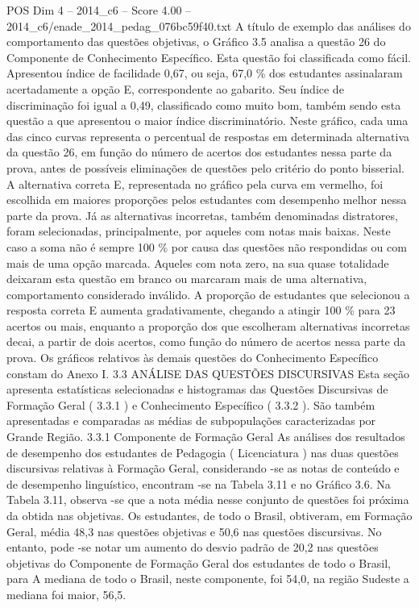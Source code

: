 \begin{textsample}{POS Dim 4 – 2014\_c6 – Score 4.00 – 2014\_c6/enade\_2014\_pedag\_076bc59f40.txt}
A título de exemplo das análises do comportamento das questões objetivas, o Gráfico 3.5 analisa a questão 26 do Componente de Conhecimento Específico.
Esta questão foi classificada como fácil.
Apresentou índice de facilidade 0,67, ou seja, 67,0 \% dos estudantes assinalaram acertadamente a opção E, correspondente ao gabarito.
Seu índice de discriminação foi igual a 0,49, classificado como muito bom, também sendo esta questão a que apresentou o maior índice discriminatório.
Neste gráfico, cada uma das cinco curvas representa o percentual de respostas em determinada alternativa da questão 26, em função do número de acertos dos estudantes nessa parte da prova, antes de possíveis eliminações de questões pelo critério do ponto bisserial.
A alternativa correta E, representada no gráfico pela curva em vermelho, foi escolhida em maiores proporções pelos estudantes com desempenho melhor nessa parte da prova.
Já as alternativas incorretas, também denominadas distratores, foram selecionadas, principalmente, por aqueles com notas mais baixas.
Neste caso a soma não é sempre 100 \% por causa das questões não respondidas ou com mais de uma opção marcada.
Aqueles com nota zero, na sua quase totalidade deixaram esta questão em branco ou marcaram mais de uma alternativa, comportamento considerado inválido.
A proporção de estudantes que selecionou a resposta correta E aumenta gradativamente, chegando a atingir 100 \% para 23 acertos ou mais, enquanto a proporção dos que escolheram alternativas incorretas decai, a partir de dois acertos, como função do número de acertos nessa parte da prova.
Os gráficos relativos às demais questões do Conhecimento Específico constam do Anexo I. 3.3 ANÁLISE DAS QUESTÕES DISCURSIVAS Esta seção apresenta estatísticas selecionadas e histogramas das Questões Discursivas de Formação Geral ( 3.3.1 ) e Conhecimento Específico ( 3.3.2 ).
São também apresentadas e comparadas as médias de subpopulações caracterizadas por Grande Região. 3.3.1 Componente de Formação Geral As análises dos resultados de desempenho dos estudantes de Pedagogia ( Licenciatura ) nas duas questões discursivas relativas à Formação Geral, considerando -se as notas de conteúdo e de desempenho linguístico, encontram -se na Tabela 3.11 e no Gráfico 3.6.
Na Tabela 3.11, observa -se que a nota média nesse conjunto de questões foi próxima da obtida nas objetivas.
Os estudantes, de todo o Brasil, obtiveram, em Formação Geral, média 48,3 nas questões objetivas e 50,6 nas questões discursivas.
No entanto, pode -se notar um aumento do desvio padrão de 20,2 nas questões objetivas do Componente de Formação Geral dos estudantes de todo o Brasil, para A mediana de todo o Brasil, neste componente, foi 54,0, na região Sudeste a mediana foi maior, 56,5.

\end{textsample}
